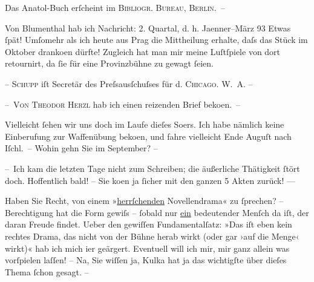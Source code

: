 \pstart
           Das Anatol-Buch erſcheint im \textsc{Bibliogr. Bureau, Berlin}. –\pend
           
\pstart
           Von Blumenthal hab ich Nachricht: 2. Quartal,
               d. h. Jaenner–März 93 Etwas ſpät! Umſomehr als ich heute
               aus Prag die Mittheilung erhalte, daſs das Stück im Oktober dranko{\geminationm}en dürfte! Zugleich hat man mir meine Luſtſpiele von
               dort retournirt, da ſie für eine Provinzbühne zu gewagt ſeien.\pend
           
\pstart
           {\pb}– \textsc{Schupp} iſt Secretär des Preſsausſchuſses für d. \textsc{Chicago. W. A.} –\pend
           
\pstart
           – \textsc{Von Theodor Herzl} hab ich einen reizenden Brief beko{\geminationm}en. –\pend
           
\pstart
           Vielleicht ſehen wir uns doch im Laufe dieſes So{\geminationm}ers.
               Ich habe nämlich keine Einberufung zur Waffenübung beko{\geminationm}en, und fahre vielleicht Ende Auguſt nach Iſchl. – Wohin gehn Sie im September? –\pend
           
\pstart
           – Ich kam die letzten Tage nicht zum Schreiben; die äußerliche Thätigkeit ſtört doch.
               Hoffentlich bald! – Sie {\pb}ko{\geminationm}en ja ſicher mit den ganzen 5 Akten zurück! ––\pend
           
\pstart
           Haben Sie Recht, von einem »\uline{herrſchenden}
               Novellendrama« zu ſprechen? – Berechtigung hat die Form gewiſs – ſobald nur \uline{ein} bedeutender Menſch da iſt, der daran Freude
               findet. Ueber den gewiſſen Fundamentalſatz: »Das iſt eben kein rechtes Drama, das
               nicht von der Bühne herab wirkt (oder gar ›auf die Menge‹ wirkt)« hab ich {\pb}mich i{\geminationm}er geärgert. Eventuell will ich mir, mir ganz allein
               was vorſpielen laſſen! – Na, Sie wiſſen ja, Kulka hat ja das wichtigſte über dieſes Thema ſchon gesagt. –\pend
           
